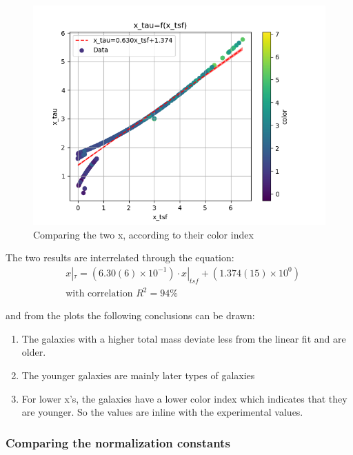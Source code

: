\documentclass[a4paper,twocolumn]{article}
\begin{document}
\begin{figure}[!htpb]
\centering
\includegraphics[width=.9\linewidth]{./figs/x_tsf-x_tau-color_color.png}
\caption{\label{fig:Comparing the two x, according to their color index}Comparing the two x, according to their color index}
\end{figure}

The two results are interrelated through the equation:
\begin{equation}\label{eq:x_tsf-x_tau}
\begin{align}
& x|_\tau = (6.30(6) \times 10^{-1})\cdot x|_{tsf} + (1.374(15) \times 10^{0}) \\ 
& \textrm{with correlation } R^2=94\%
\end{align}
\end{equation}
\noindent

and from the plots the following conclusions can be drawn:

\begin{enumerate}
\item The galaxies with a higher total mass deviate less from the linear fit and are older.
\item The younger galaxies are mainly later types of galaxies
\item For lower x's, the galaxies have a lower color index which indicates that they are younger. So the values are inline with the experimental values.
\end{enumerate}

\subsubsection{Comparing the normalization constants}
\label{sec:org43d0c9b}
\end{document}
